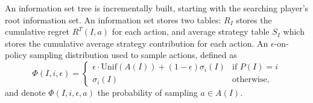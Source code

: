 An information set tree is incrementally built, starting with the searching player's root information set.
An information set stores two tables: $R_I$ stores the cumulative regret $R^T(I,a)$ for each action, 
and average strategy table $S_I$ which stores the cumulative average strategy contribution for each action. 
An $\epsilon$-on-policy sampling distribution used to sample actions, defined as
\begin{equation*}
\label{eq:ossample}
\Phi(I,i,\epsilon) = \left\{
\begin{array}{ll}
\epsilon \cdot \mbox{Unif}(A(I)) + (1-\epsilon)\sigma_i(I) & \mbox{if } P(I) = i\\ 
\sigma_i(I)                                          & \mbox{otherwise,}
\end{array} \right.
\end{equation*}
and denote $\Phi(I,i,\epsilon,a)$ the probability of sampling $a \in A(I)$.






